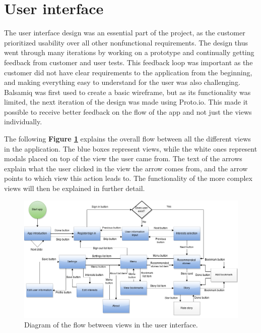 \section{User interface}

The user interface design was an essential part of the project, as the customer prioritized usability over all other nonfunctional requirements. The design thus went through many iterations by working on a prototype and continually getting feedback from customer and user tests. This feedback loop was important as the customer did not have clear requirements to the application from the beginning, and making everything easy to understand for the user was also challenging.  Balsamiq was first used to create a basic wireframe, but as its functionality was limited, the next iteration of the design was made using Proto.io. This made it possible to receive better feedback on the flow of the app and not just the views individually. \newline

The following \textbf{Figure \ref{Fig:flow_diagram}} explains the overall flow between all the different views in the application. The blue boxes represent views, while the white ones represent modals placed on top of the view the user came from. The text of the arrows explain what the user clicked in the view the arrow comes from, and the arrow points to which view this action leads to.  The functionality of the more complex views will then be explained in further detail.

\begin{figure}[h!]
	\centering
	\includegraphics[width=\textwidth]{fig/flow_diagram}
	\caption{Diagram of the flow between views in the user interface.}
	\label{Fig:flow_diagram}
\end{figure}

